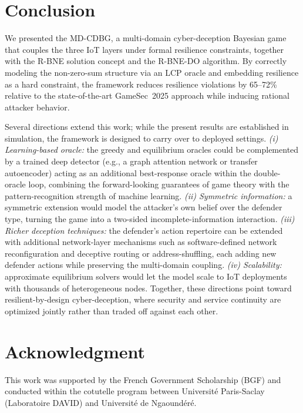 \documentclass[conference]{IEEEtran}
\begin{document}
\section{Conclusion}
\label{sec:conclusion}

We presented the MD-CDBG, a multi-domain cyber-deception Bayesian game that
couples the three IoT layers under formal resilience constraints, together with
the R-BNE solution concept and the R-BNE-DO algorithm. By correctly modeling the
non-zero-sum structure via an LCP oracle and embedding resilience as a hard
constraint, the framework reduces resilience violations by 65--72\% relative to
the state-of-the-art GameSec~2025 approach while inducing rational attacker
behavior.

Several directions extend this work; while the present results are established
in simulation, the framework is designed to carry over to deployed settings.
\emph{(i) Learning-based oracle:} the
greedy and equilibrium oracles could be complemented by a trained deep detector
(e.g., a graph attention network or transfer autoencoder) acting as an
additional best-response oracle within the double-oracle loop, combining the
forward-looking guarantees of game theory with the pattern-recognition strength
of machine learning. \emph{(ii) Symmetric information:} a symmetric extension
would model the attacker's own belief over the defender
type, turning the game into a two-sided incomplete-information interaction.
\emph{(iii) Richer deception techniques:} the defender's action repertoire can be
extended with additional network-layer mechanisms such as software-defined
network reconfiguration and deceptive routing or address-shuffling, each adding
new defender actions while preserving the
multi-domain coupling. \emph{(iv) Scalability:} approximate equilibrium solvers
would let the model scale to IoT deployments with thousands of heterogeneous
nodes. Together, these directions point toward resilient-by-design
cyber-deception, where security and service continuity are optimized jointly
rather than traded off against each other.

\section*{Acknowledgment}
This work was supported by the French Government Scholarship (BGF) and conducted
within the cotutelle program between Universit\'e Paris-Saclay (Laboratoire
DAVID) and Universit\'e de Ngaound\'er\'e.



\end{document}
